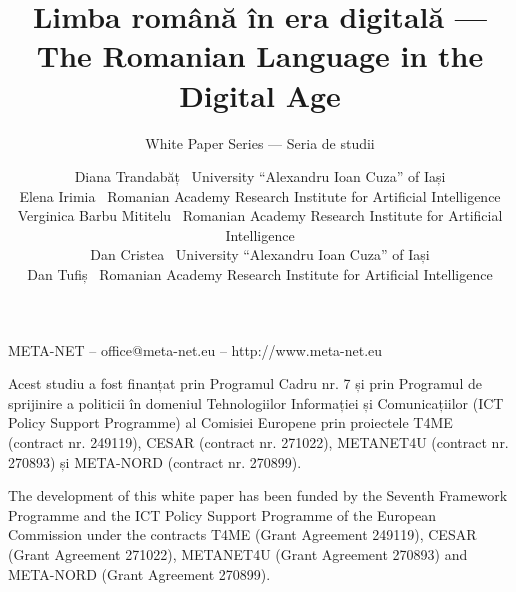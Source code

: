 \documentclass[]{../../metanetpaper}
\title{Limba română în era digitală --- The Romanian Language in the Digital Age}
\subtitle{White Paper Series --- Seria de studii}
\author{
  Diana Trandabăț~ {\small University “Alexandru Ioan Cuza” of Iași}\\
  Elena Irimia~ {\small Romanian Academy Research Institute for Artificial Intelligence}\\
  Verginica Barbu Mititelu~ {\small Romanian Academy Research Institute for Artificial Intelligence} \\
  Dan Cristea~ {\small University “Alexandru Ioan Cuza” of Iași}\\
  Dan Tufiș~ {\small Romanian Academy Research Institute for Artificial Intelligence}
}
\begin{document}
\renewcommand*{\figureformat}{\sffamily\thefigure\autodot}

\maketitle

\null
\pagestyle{empty} 

\centerline{META-NET -- office@meta-net.eu -- http://www.meta-net.eu}

\vfill

\begin{small}
 Acest studiu a fost finanțat prin Programul Cadru nr. 7 și prin Programul de sprijinire a politicii în domeniul Tehnologiilor Informației și Comunicațiilor (ICT Policy Support Programme) al
 Comisiei Europene prin proiectele T4ME (contract nr. 249119), CESAR (contract nr. 271022), METANET4U (contract nr. 270893) și META-NORD (contract nr. 270899).
\end{small}

\bigskip
\begin{small}
  The development of this white paper has been funded by the Seventh
  Framework Programme and the ICT Policy Support Programme of the
  European Commission under the contracts T4ME (Grant Agreement 249119),
  CESAR (Grant Agreement 271022), METANET4U (Grant Agreement 270893)
  and META-NORD (Grant Agreement 270899).
\end{small}

\clearpage

\setcounter{page}{5}
\pagestyle{scrheadings}

\cleardoublepage


\end{document}
